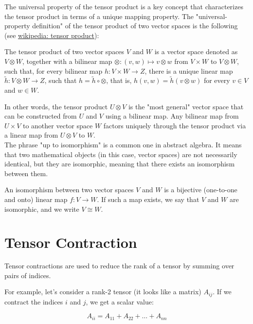 The universal property of the tensor product is a key concept that
characterizes the tensor product in terms of a unique mapping property.
The "universal-property definition" of the tensor product of two vector spaces is the following
(see \href{https://en.wikipedia.org/wiki/Tensor_product#Universal_property}{wikipedia: tensor product}):

The tensor product of two vector spaces $V$ and $W$ is a vector space denoted as
$V\otimes W$, together with a bilinear map $\otimes : (v,w) \mapsto v\otimes w$
from $V\times W$ to $V\otimes W$, such that, for every bilinear map
$h : V\times W\to Z$, there is a unique linear map $\tilde{h} :V\otimes W\to Z$,
such that $h= \tilde{h} \circ \otimes$,
that is, $h(v,w) = \tilde{h} (v\otimes w)$ for every $v\in V$ and $w\in W$.


In other words, the tensor product $U \otimes V$ is the "most general" vector space that can be constructed
from $U$ and $V$ using a bilinear map.
Any bilinear map from $U \times V$ to another vector space $W$ factors uniquely through the tensor product
via a linear map from $U \otimes V$ to $W$.
\\

The phrase "up to isomorphism" is a common one in abstract algebra.
It means that two mathematical objects (in this case, vector spaces) are not necessarily identical,
but they are isomorphic, meaning that there exists an isomorphism between them.

An isomorphism between two vector spaces $V$ and $W$ is a bijective (one-to-one and onto)
linear map $f: V \to W$.
If such a map exists, we say that $V$ and $W$ are isomorphic, and we write $V \cong W$.








\section{Tensor Contraction}

Tensor contractions are used to reduce the rank of a tensor by summing over pairs of indices.

For example, let's consider a rank-2 tensor (it looks like a matrix) $A_{ij}$.
If we contract the indices $i$ and $j$, we get a scalar value:

$$
A_{ii} = A_{11} + A_{22} + \dots + A_{nn}
$$

